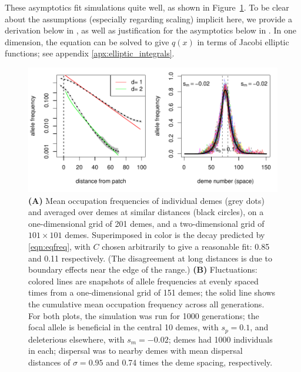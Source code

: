 \documentclass{article}
\begin{document}
These asymptotics fit simulations quite well, as shown in Figure~\ref{fig:sim_occupation_freqs}.
To be clear about the assumptions (especially regarding scaling) implicit here,
we provide a derivation below in , 
as well as justification for the asymptotics below in .
In one dimension, the equation can be solved to give $q(x)$ 
in terms of Jacobi elliptic functions; see appendix \ref{apx:elliptic_integrals}.

\begin{figure}[ht!]
  \begin{center}
    \includegraphics{sim-occupation-freqs}
  \end{center}
  \caption{
  \textbf{(A)} 
  Mean occupation frequencies of individual demes (grey dots)
  and averaged over demes at similar distances (black circles), on
  a one-dimensional grid of 201 demes, and
  a two-dimensional grid of $101\times 101$ demes.
  Superimposed in color is the decay predicted by \eqref{eqn:eqfreq},
  with $C$ chosen arbitrarily to give a reasonable fit: 0.85 and 0.11 respectively.
  (The disagreement at long distances is due to boundary effects near the edge of the range.)
  \textbf{(B)} 
  Fluctuations: colored lines are snapshots of allele frequencies at evenly spaced times
  from a one-dimensional grid of 151 demes;
  the solid line shows the cumulative mean occupation frequency across all generations.
  For both plots, the simulation was run for 1000 generations;
  the focal allele is beneficial in the central 10 demes, with $s_p=0.1$,
  and deleterious elsewhere, with $s_m=-0.02$; 
  demes had 1000 individuals in each;
  dispersal was to nearby demes with mean dispersal distances of 
  $\sigma = 0.95$ and 0.74 times the deme spacing, respectively.
   }   \label{fig:sim_occupation_freqs}
\end{figure}
\end{document}
